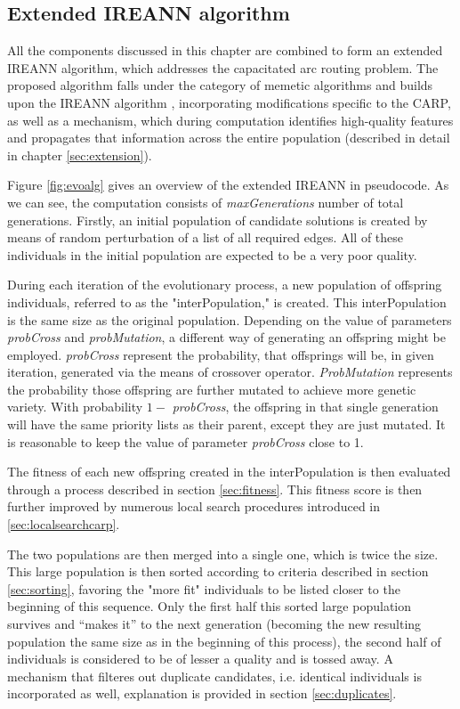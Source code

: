 \documentclass[twoside]{ctuthesis}
\theoremstyle{plain}
\theoremstyle{definition}
\theoremstyle{note}
\begin{document}
\subsection{Extended IREANN algorithm}
\label{sec:evolution}
All the components discussed in this chapter are combined to form an extended IREANN algorithm, which addresses the capacitated arc routing problem. The proposed algorithm falls under the category of memetic algorithms and builds upon the IREANN algorithm \cite{kubalik2014novel}, incorporating modifications specific to the CARP, as well as a mechanism, which during computation identifies high-quality features and propagates that information across the entire population (described in detail in chapter \ref{sec:extension}).

Figure \ref{fig:evoalg} gives an overview of the extended IREANN in pseudocode. As we can see, the computation consists of \emph{maxGenerations} number of total generations. Firstly, an initial population of candidate solutions is created by means of random perturbation of a list of all required edges. All of these individuals in the initial population are expected to be a very poor quality.

During each iteration of the evolutionary process, a new population of offspring individuals, referred to as the "interPopulation," is created. This interPopulation is the same size as the original population. Depending on the value of parameters \emph{probCross} and \emph{probMutation}, a different way of generating an offspring might be employed. \emph{probCross} represent the probability, that offsprings will be, in given iteration, generated via the means of crossover operator. \emph{ProbMutation} represents the probability those offspring are further mutated to achieve more genetic variety. With probability $1 -$ \emph{probCross}, the offspring in that single generation will have the same priority lists as their parent, except they are just mutated. It is reasonable to keep the value of parameter \emph{probCross} close to 1.

The fitness of each new offspring created in the interPopulation is then evaluated through a process described in section \ref{sec:fitness}. This fitness score is then further improved by numerous local search procedures introduced in \ref{sec:localsearchcarp}.

The two populations are then merged into a single one, which is twice the size. This large population is then sorted according to criteria described in section \ref{sec:sorting}, favoring the "more fit" individuals to be listed closer to the beginning of this sequence. Only the first half this sorted large population survives and ``makes it'' to the next generation (becoming the new resulting population the same size as in the beginning of this process), the second half of individuals is considered to be of lesser a quality and is tossed away. A mechanism that filteres out duplicate candidates, i.e. identical individuals is incorporated as well, explanation is provided in section \ref{sec:duplicates}.
\end{document}
